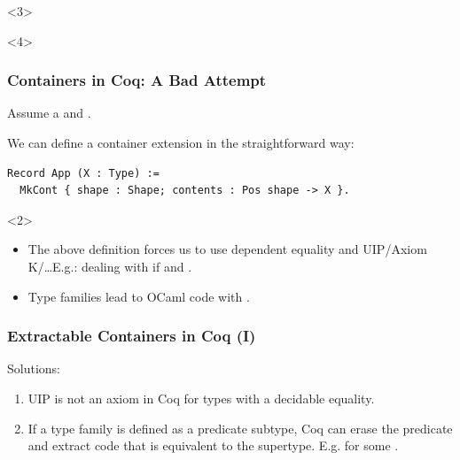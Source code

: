 \begin{frame}
  \begin{onlyenv}<3>
  \end{onlyenv}


  \begin{onlyenv}<4>
  \end{onlyenv}

\end{frame}

\begin{frame}[fragile]
  \frametitle{Containers in Coq: A Bad Attempt}
  Assume a  and .
  \vspace{.4cm}

  We can define a container extension in the straightforward way:
  \begin{verbatim}
Record App (X : Type) :=
  MkCont { shape : Shape; contents : Pos shape -> X }.
  \end{verbatim}
  \vspace{.2cm}

  \begin{onlyenv}<2>
  \begin{center}
  \begin{minipage}{.8\columnwidth}
    \begin{infobox}
      \begin{itemize}
        \item The above definition forces us to use dependent equality and
          UIP/Axiom K/\ldots E.g.: dealing with   if
           and .
        \item Type families lead to OCaml code with .
      \end{itemize}
    \end{infobox}
  \end{minipage}
  \end{center}
  \end{onlyenv}
\end{frame}

\begin{frame}[fragile]
  \frametitle{Extractable Containers in Coq (I)}

  Solutions:
  \begin{enumerate}
    \item UIP is \alert{not an axiom} in Coq for types with a \alert{decidable
      equality}.
    \item If a type family is defined as a \alert{predicate subtype}, Coq can
      erase the predicate and extract code that is equivalent to the supertype.
      E.g.  for some .
  \end{enumerate}
\end{frame}

